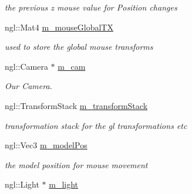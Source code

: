 \begin{DoxyCompactItemize}
\begin{DoxyCompactList}\small\item\em the previous z mouse value for Position changes \item\end{DoxyCompactList}\item 
\hypertarget{classNGLDraw_add58d5447775b9c8eef3cbd6a45d2581}{
ngl::Mat4 \hyperlink{classNGLDraw_add58d5447775b9c8eef3cbd6a45d2581}{m\_\-mouseGlobalTX}}
\label{classNGLDraw_add58d5447775b9c8eef3cbd6a45d2581}

\begin{DoxyCompactList}\small\item\em used to store the global mouse transforms \item\end{DoxyCompactList}\item 
\hypertarget{classNGLDraw_a080ff0bfec61d47166d71c6b555e0f6d}{
ngl::Camera $\ast$ \hyperlink{classNGLDraw_a080ff0bfec61d47166d71c6b555e0f6d}{m\_\-cam}}
\label{classNGLDraw_a080ff0bfec61d47166d71c6b555e0f6d}

\begin{DoxyCompactList}\small\item\em Our Camera. \item\end{DoxyCompactList}\item 
\hypertarget{classNGLDraw_ac5d0f5ee9300506e19196866a89e532d}{
ngl::TransformStack \hyperlink{classNGLDraw_ac5d0f5ee9300506e19196866a89e532d}{m\_\-transformStack}}
\label{classNGLDraw_ac5d0f5ee9300506e19196866a89e532d}

\begin{DoxyCompactList}\small\item\em transformation stack for the gl transformations etc \item\end{DoxyCompactList}\item 
\hypertarget{classNGLDraw_a402443700f5c74bc715fc4959dc3d748}{
ngl::Vec3 \hyperlink{classNGLDraw_a402443700f5c74bc715fc4959dc3d748}{m\_\-modelPos}}
\label{classNGLDraw_a402443700f5c74bc715fc4959dc3d748}

\begin{DoxyCompactList}\small\item\em the model position for mouse movement \item\end{DoxyCompactList}\item 
\hypertarget{classNGLDraw_ac9b771b3fe87d387319e4a779f4cc4e6}{
ngl::Light $\ast$ \hyperlink{classNGLDraw_ac9b771b3fe87d387319e4a779f4cc4e6}{m\_\-light}}
\label{classNGLDraw_ac9b771b3fe87d387319e4a779f4cc4e6}


\end{DoxyCompactItemize}
